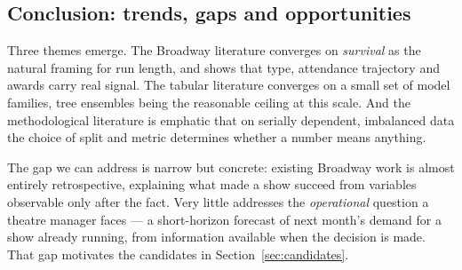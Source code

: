 \subsection{Conclusion: trends, gaps and opportunities}

Three themes emerge. The Broadway literature converges on \emph{survival} as the
natural framing for run length, and shows that type, attendance trajectory and
awards carry real signal. The tabular literature converges on a small set of
model families, tree ensembles being the reasonable ceiling at this scale. And
the methodological literature is emphatic that on serially dependent, imbalanced
data the choice of split and metric determines whether a number means anything.

The gap we can address is narrow but concrete: existing Broadway work is almost
entirely retrospective, explaining what made a show succeed from variables
observable only after the fact. Very little addresses the \emph{operational}
question a theatre manager faces --- a short-horizon forecast of next month's
demand for a show already running, from information available when the decision
is made. That gap motivates the candidates in Section~\ref{sec:candidates}.
